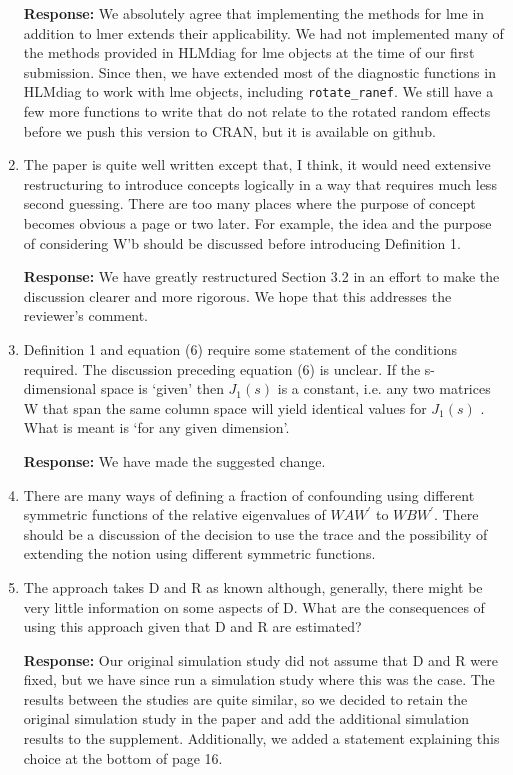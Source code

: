 \documentclass[11pt]{article}
\newcommand{\alnote}[1]{\todo[inline,color=green!40]{#1}} %
\begin{document}
\begin{enumerate}
\textbf{Response:} We absolutely agree that implementing the methods for lme in addition to lmer extends their applicability. We had not implemented many of the methods provided in HLMdiag for lme objects at the time of our first submission. Since then, we have extended most of the diagnostic functions in HLMdiag to work with lme objects, including \verb=rotate_ranef=. We still have a few more functions to write that do not relate to the rotated random effects before we push this version to CRAN, but it is available on github.

\item The paper is quite well written except that, I think, it would need extensive restructuring to introduce concepts logically in a way that requires much less second guessing. There are too many places where the purpose of concept becomes obvious a page or two later. For example, the idea and the purpose of considering W'b should be discussed before introducing Definition 1.

\textbf{Response:} We have greatly restructured Section 3.2 in an effort to make the discussion clearer and more rigorous. We hope that this addresses the reviewer's comment.


\item Definition 1 and equation (6) require some statement of the conditions required. The
discussion preceding equation (6) is unclear. If the s-dimensional space is `given' then $J_1 (s)$ is a constant, i.e. any two matrices W that span the same column space will yield
identical values for $J_1 (s)$ . What is meant is `for any given dimension'.

\textbf{Response:} We have made the suggested change.

\item There are many ways of defining a fraction of confounding using different symmetric functions of the relative eigenvalues of $WAW^\prime$ to $WBW^\prime$. There should be a discussion of the decision to use the trace and the possibility of extending the notion using different symmetric functions.

\alnote{Something for the discussion section?}

\item The approach takes D and R as known although, generally, there might be very little information on some aspects of D. What are the consequences of using this approach given that D and R are estimated?

\textbf{Response:} Our original simulation study did not assume that D and R were fixed, but we have since run a simulation study where this was the case. The results between the studies are quite similar, so we decided to retain the original simulation study in the paper and add the additional simulation results to the supplement. Additionally, we added a statement explaining this choice at the bottom of page 16.


\end{enumerate}
\end{document}
